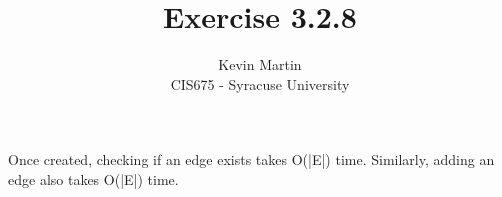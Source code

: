 \documentclass{article}
\author{Kevin Martin\\ CIS675 - Syracuse University}
\title{Exercise 3.2.8}
\begin{document}
\maketitle
Once created, checking if an edge exists takes O(|E|) time. Similarly, adding an edge also takes O(|E|) time.
\end{document}
